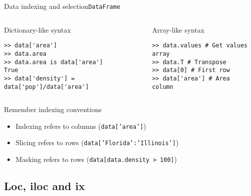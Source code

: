 \documentclass[10pt,compress]{beamer} %
\begin{document}
\begin{frame}[fragile]{Data indexing and selection}{\texttt{DataFrame}}
	\begin{columns}
		\begin{exampleblock}{Dictionary-like syntax}
		\vspace{-0.2cm} 
			\begin{lstlisting}
>> data['area']
>> data.area
>> data.area is data['area']
True
>> data['density'] = data['pop']/data['area']
			\end{lstlisting}
			\vspace{-0.2cm} 
		\end{exampleblock}

		\begin{exampleblock}{Array-like syntax}
		\vspace{-0.2cm} 
			\begin{lstlisting}
>> data.values # Get values array
>> data.T # Transpose
>> data[0] # First row
>> data['area'] # Area column
\end{lstlisting}
			\vspace{-0.2cm} 
		\end{exampleblock}
	\end{columns}

	\bigskip

	Remember indexing conventions
	\begin{itemize}
		\item Indexing refers to columns (\texttt{data['area']})
		\item Slicing refers to rows (\texttt{data['Florida':'Illinois']})
		\item Masking refers to rows (\texttt{data[data.density > 100]})
	\end{itemize}
\end{frame}

\subsection{Loc, iloc and ix}
\end{document}
